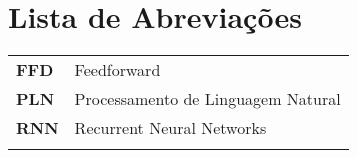 \chapter{Lista de Abreviações}
\begin{tabular}{ll}
\vspace{3mm}
\textbf{FFD} 		 & Feedforward\\ \vspace{3mm}
\textbf{PLN} 		 & Processamento de Linguagem Natural\\ \vspace{3mm}
\textbf{RNN} 		 & Recurrent Neural Networks\\ \vspace{3mm}

\end{tabular}

